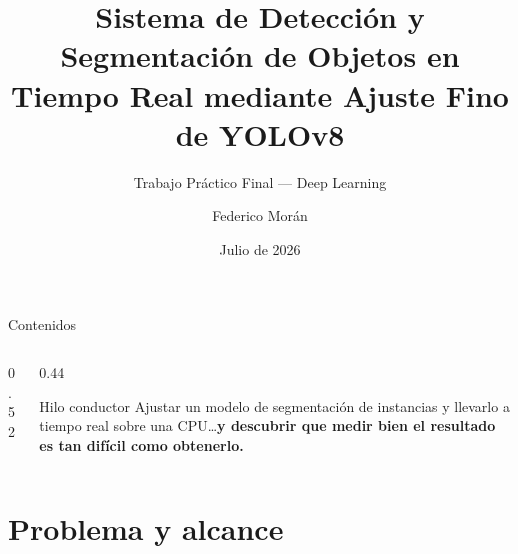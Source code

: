\documentclass[aspectratio=169,11pt]{beamer}
\title[Detección y segmentación en tiempo real]{Sistema de Detección y Segmentación de
Objetos en Tiempo Real mediante Ajuste Fino de YOLOv8}
\subtitle{Trabajo Práctico Final --- Deep Learning}
\author[Federico Morán]{Federico Morán}
\institute[Maestría en IA]{Maestría en Inteligencia Artificial}
\date{Julio de 2026}
\begin{document}
\begin{frame}[plain]
  \titlepage
\end{frame}

\begin{frame}{Contenidos}
  \begin{columns}[T]
    \begin{column}{0.52\textwidth}
      \tableofcontents
    \end{column}
    \begin{column}{0.44\textwidth}
      \begin{block}{Hilo conductor}
        \footnotesize
        Ajustar un modelo de segmentación de instancias y llevarlo a tiempo real
        sobre una CPU\ldots \textbf{y descubrir que medir bien el resultado es tan
        difícil como obtenerlo.}
      \end{block}
    \end{column}
  \end{columns}
\end{frame}

\section{Problema y alcance}
\end{document}
